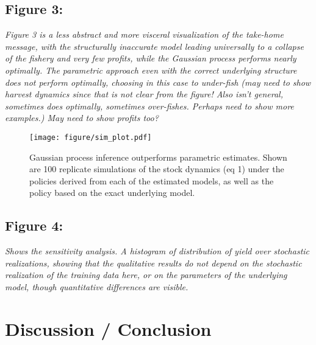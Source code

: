 \documentclass[author-year, review]{elsarticle} %
\begin{document}
\subsection{Figure 3:}

\emph{Figure 3 is a less abstract and more visceral visualization of the
take-home message, with the structurally inaccurate model leading
universally to a collapse of the fishery and very few profits, while the
Gaussian process performs nearly optimally. The parametric approach even
with the correct underlying structure does not perform optimally,
choosing in this case to under-fish (may need to show harvest dynamics
since that is not clear from the figure! Also isn't general, sometimes
does optimally, sometimes over-fishes. Perhaps need to show more
examples.) May need to show profits too?}

\begin{figure}[htbp]
\centering
\texttt{[image: figure/sim\_plot.pdf]}
\caption{Gaussian process inference outperforms parametric estimates.
Shown are 100 replicate simulations of the stock dynamics (eq 1) under
the policies derived from each of the estimated models, as well as the
policy based on the exact underlying model.}
\end{figure}

\subsection{Figure 4:}

\emph{Shows the sensitivity analysis. A histogram of distribution of
yield over stochastic realizations, showing that the qualitative results
do not depend on the stochastic realization of the training data here,
or on the parameters of the underlying model, though quantitative
differences are visible.}

\section{Discussion / Conclusion}
\end{document}
